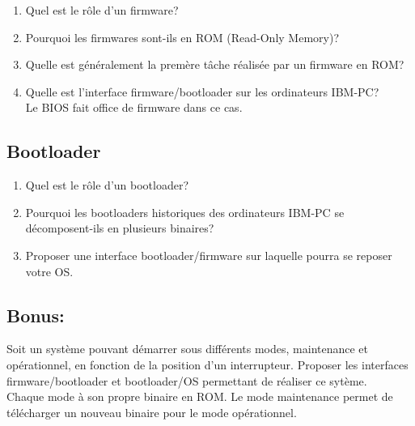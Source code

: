 \begin{enumerate}
\item Quel est le rôle d'un firmware?
\item Pourquoi les firmwares sont-ils en ROM (Read-Only Memory)?
\item Quelle est généralement la premère tâche réalisée par un firmware en ROM?
\item Quelle est l'interface firmware/bootloader sur les ordinateurs IBM-PC?\\
      Le BIOS fait office de firmware dans ce cas.
\end{enumerate}

\subsection{Bootloader}
\begin{enumerate}
\item Quel est le rôle d'un bootloader?
\item Pourquoi les bootloaders historiques des ordinateurs IBM-PC se décomposent-ils en plusieurs binaires?
\item Proposer une interface bootloader/firmware sur laquelle pourra se reposer votre OS.
\end{enumerate}

\subsection*{Bonus:}
Soit un système pouvant démarrer sous différents modes, maintenance et opérationnel, en fonction de la position d'un interrupteur. Proposer les interfaces firmware/bootloader et bootloader/OS permettant de réaliser ce sytème.\\
Chaque mode à son propre binaire en ROM. Le mode maintenance permet de télécharger un nouveau binaire pour le mode opérationnel.

